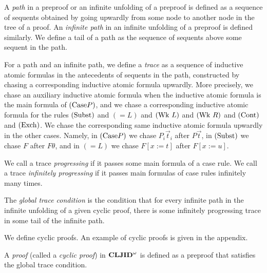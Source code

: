 \begin{Def}[Trace]\rm
A {\em path} in a preproof or an infinite unfolding of a preproof
is defined as a sequence of sequents obtained by going
upwardly from some node to another node in the tree
of a proof.
An {\em infinite path} in an infinite unfolding of a preproof
is defined similarly.
We define a tail of a path as the sequence of sequents above
some sequent in the path.

For a path and an infinite path,
we define
a {\em trace}
as
a sequence of inductive atomic formulas 
in the antecedents of sequents in the path, 
constructed by
chasing a corresponding inductive atomic formula upwardly.
More precisely,
we chase an auxiliary inductive atomic formula when 
the inductive atomic formula is the main formula of $({\rm Case} P)$,
and
we chase a corresponding inductive atomic formula for
the rules $({\rm Subst})$ and $(=L)$ and $({\rm Wk}\ L)$ and $({\rm Wk}\ R)$ and 
$({\rm Cont})$ and $({\rm Exch})$.
We chase the corresponding same inductive atomic formula upwardly in the other cases.
Namely,
in $({\rm Case} P)$ we chase $P_i\Vec t_i$ after $P\Vec t$,
in $({\rm Subst})$ we chase $F$ after $F\theta$,
and
in $(=L)$ we chase $F[x:=t]$ after $F[x:=u]$.

We call a trace {\em progressing} 
if it passes some main formula of a case rule.
We call a trace {\em infinitely progressing} 
if it passes main formulas of case rules infinitely many times.

The {\em global trace condition} \cite{Brotherston11,Brotherston06} is 
the condition that
for every infinite path in the infinite unfolding of a given cyclic proof,
there is some infinitely progressing trace in some tail of the infinite path.
\end{Def}

We define cyclic proofs.
An example of cyclic proofs is given in the appendix.

\begin{Def}\rm
A {\em proof} (called a {\em cyclic proof}) in ${{\bf CLJID}^\omega}$ is defined 
as a preproof that satisfies the global trace condition.
\end{Def}

